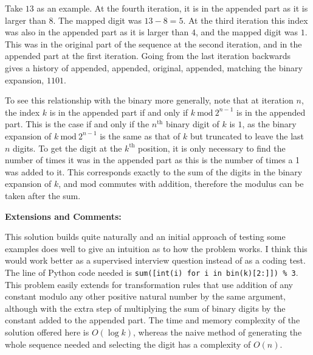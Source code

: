 Take $13$ as an example. At the fourth iteration, it is in the appended part as it is larger than $8$. The mapped digit was $13 - 8 = 5$. At the third iteration this index was also in the appended part as it is larger than $4$, and the mapped digit was $1$. This was in the original part of the sequence at the second iteration, and in the appended part at the first iteration. Going from the last iteration backwards gives a history of appended, appended, original, appended, matching the binary expansion, $1101$.

To see this relationship with the binary more generally, note that at iteration $n$, the index $k$ is in the appended part if and only if $k \ \text{mod} \ 2^{n-1}$ is in the appended part. This is the case if and only if the $n^\text{th}$ binary digit of $k$ is $1$, as the binary expansion of $k \ \text{mod} \ 2^{n-1}$ is the same as that of $k$ but truncated to leave the last $n$ digits. To get the digit at the $k^\text{th}$ position, it is only necessary to find the number of times it was in the appended part as this is the number of times a 1 was added to it. This corresponds exactly to the sum of the digits in the binary expansion of $k$, and $\text{mod}$ commutes with addition, therefore the modulus can be taken after the sum.

\textbf{Extensions and Comments:}

This solution builds quite naturally and an initial approach of testing some examples does well to give an intuition as to how the problem works. I think this would work better as a supervised interview question instead of as a coding test. The line of Python code needed is \texttt{sum([int(i) for i in bin(k)[2:]]) \% 3}. This problem easily extends for transformation rules that use addition of any constant modulo any other positive natural number by the same argument, although with the extra step of multiplying the sum of binary digits by the constant added to the appended part. The time and memory complexity of the solution offered here is $O(\log k)$, whereas the naive method of generating the whole sequence needed and selecting the digit has a complexity of $O(n)$.